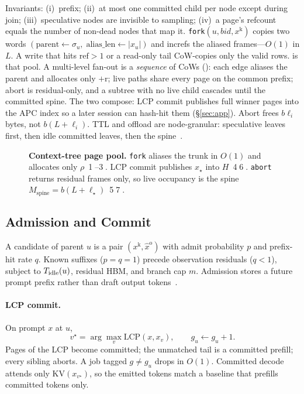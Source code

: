 Invariants: (i)~prefix; (ii)~at most one committed child per node except during join; (iii)~speculative nodes are invisible to sampling; (iv)~a page's refcount equals the number of non-dead nodes that map it.
\texttt{fork}$(u,\mathit{bid},x^{\mathrm{k}})$ copies two words $(\mathrm{parent}\leftarrow\sigma_u,\;\mathrm{alias\_len}\leftarrow|x_u|)$ and increfs the aliased frames---$O(1)$ in $L$.
A write that hits $\mathrm{ref}>1$ or a read-only tail CoW-copies only the valid rows.
 is that pool.
A multi-level fan-out is a \emph{sequence} of CoWs (): each edge aliases the parent and allocates only $+$r; live paths share every page on the common prefix; abort is residual-only, and a subtree with no live child cascades until the committed spine.
The two compose: LCP commit publishes full winner pages into the APC index so a later session can hash-hit them (\S\ref{sec:app}).
Abort frees $b\ell_i$ bytes, not $b(L+\ell_i)$.
TTL and offload are node-granular: speculative leaves first, then idle committed leaves, then the spine~\cite{continuum,mori}.

\begin{figure}[t]
\centering
\resizebox{\textwidth}{!}{}
\caption{\textbf{Context-tree page pool.}
\texttt{fork} aliases the trunk in $O(1)$ and allocates only $\rho$~\textcircled{1}--\textcircled{3}.
LCP commit publishes $x_\star$ into $H$~\textcircled{4}\textcircled{6}.
\texttt{abort} returns residual frames only, so live occupancy is the spine $M_{\mathrm{spine}}{=}b(L{+}\ell_\star)$~\textcircled{5}\textcircled{7}.}
\label{fig:pool}
\end{figure}

\subsection{Admission and Commit}
\label{sec:speculate}
A candidate of parent $u$ is a pair $(x^{\mathrm{k}},\hat{x}^{\mathrm{o}})$ with admit probability $p$ and prefix-hit rate $q$.
Known suffixes ($p{=}q{=}1$) precede observation residuals ($q{<}1$), subject to $T_{\mathrm{idle}}(u)$, residual HBM, and branch cap $m$.
Admission stores a future prompt prefix rather than draft output tokens~\cite{speculative,medusa}.

\paragraph{LCP commit.}
On prompt $x$ at $u$,
\begin{equation}
\label{eq:lcp}
v^\star=\arg\max_{v}\mathrm{LCP}(x,x_v),\qquad
g_u\leftarrow g_u+1.
\end{equation}
Pages of the LCP become committed; the unmatched tail is a committed prefill; every sibling aborts.
A job tagged $g\neq g_u$ drops in $O(1)$.
Committed decode attends only $\mathrm{KV}(x_{v^\star})$, so the emitted tokens match a baseline that prefills committed tokens only.

